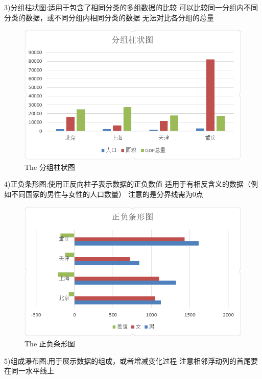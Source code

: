 \documentclass{article}
\begin{document}
\begin{itemize}
    		3)分组柱状图:适用于包含了相同分类的多组数据的比较
    		可以比较同一分组内不同分类的数据，或不同分组内相同分类的数据
    		无法对比各分组的总量\par
    		\begin{figure}[h!]
    			\centering
    			\includegraphics[scale=0.7]{fenzu}
    			\caption{The 分组柱状图}
    			\label{fig:fenzu}
    		\end{figure}
    		4)正负条形图:使用正反向柱子表示数据的正负数值
    		适用于有相反含义的数据（例如不同国家的男性与女性的人口数量）
    		注意的是分界线需为0点\par
    		\begin{figure}[h!]
    			\centering
    			\includegraphics[scale=0.7]{zhengfu}
    			\caption{The 正负条形图}
    			\label{fig:zhengfu}
    		\end{figure}
    		5)组成瀑布图:用于展示数据的组成，或者增减变化过程
    		注意相邻浮动列的首尾要在同一水平线上\par
    	    \begin{figure}[h!]

\end{figure}
\end{itemize}
\end{document}
